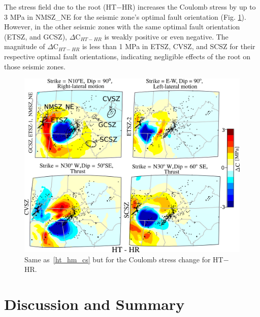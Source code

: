 \documentclass[draft,linenumbers]{agujournal2018}
\begin{document}
The stress field due to the root (HT$-$HR) increases the Coulomb stress by up to 3 MPa in NMSZ\_NE for the seismic zone's optimal fault orientation (Fig. \ref{ht_hr_cs}). However, in the other seismic zones with the same optimal fault orientation (ETSZ, and GCSZ), $\Delta $C$_{HT-HR}$ is weakly positive or even negative. The magnitude of $\Delta $C$_{HT-HR}$ is less than 1 MPa in ETSZ, CVSZ, and SCSZ for their respective optimal fault orientations, indicating negligible effects of the root on those seismic zones. 

\begin{figure}[h!]
    \centering
    \includegraphics[width=0.75\linewidth]{figures/cs_ht_hr.png}
    \caption{Same as~\ref{ht_hm_cs} but for the Coulomb stress change for HT$-$HR. }
    \label{ht_hr_cs}
\end{figure}
    
\section{Discussion and Summary}
    
\end{document}
